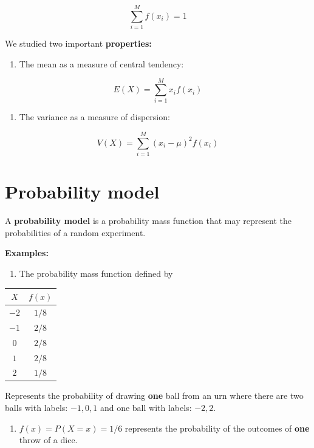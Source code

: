 \documentclass[
]{book}
\providecommand{\tightlist}{%
  \setlength{\itemsep}{0pt}\setlength{\parskip}{0pt}}
\begin{document}
\[\sum_{i=1}^M f(x_i)=1\]

We studied two important \textbf{properties:}

\begin{enumerate}
\def\labelenumi{\arabic{enumi})}
\tightlist
\item
  The mean as a measure of central tendency:
\end{enumerate}

\[E(X)= \sum_{i=1}^M x_i f(x_i)\]

\begin{enumerate}
\def\labelenumi{\arabic{enumi})}
\setcounter{enumi}{1}
\tightlist
\item
  The variance as a measure of dispersion:
\end{enumerate}

\[V(X)= \sum_{i=1}^M (x_i-\mu)^2 f(x_i)\]

\hypertarget{probability-model}{%
\section{Probability model}\label{probability-model}}

A \textbf{probability model} is a probability mass function that may represent the probabilities of a random experiment.

\textbf{Examples:}

\begin{enumerate}
\def\labelenumi{\arabic{enumi})}
\tightlist
\item
  The probability mass function defined by
\end{enumerate}

\begin{longtable}[]{@{}cc@{}}
\toprule
\(X\) & \(f(x)\) \\
\midrule
\endhead
\(-2\) & \(1/8\) \\
\(-1\) & \(2/8\) \\
\(0\) & \(2/8\) \\
\(1\) & \(2/8\) \\
\(2\) & \(1/8\) \\
\bottomrule
\end{longtable}

Represents the probability of drawing \textbf{one} ball from an urn where there are two balls with labels: \(-1, 0, 1\) and one ball with labels: \(-2, 2\).

\begin{enumerate}
\def\labelenumi{\arabic{enumi})}
\setcounter{enumi}{1}
\tightlist
\item
  \(f(x)=P(X=x)=1/6\) represents the probability of the outcomes of \textbf{one} throw of a dice.
\end{enumerate}
\end{document}
